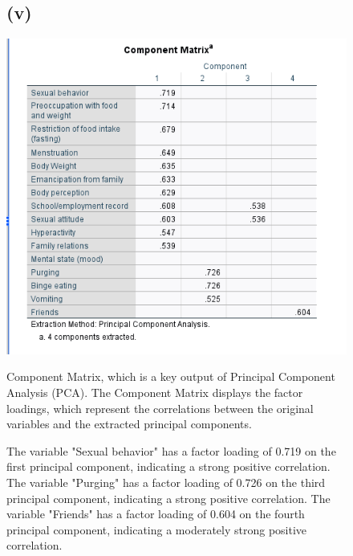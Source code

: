 \documentclass[english,10pt,a4paper]{article}
\begin{document}
\begin{figure}
		\subsection*{(v)}
	\includegraphics[width=1\linewidth]{component matrix.png}

Component Matrix, which is a key output of Principal Component Analysis (PCA). The Component Matrix displays the factor loadings, which represent the correlations between the original variables and the extracted principal components.

The variable "Sexual behavior" has a factor loading of 0.719 on the first principal component, indicating a strong positive correlation.
The variable "Purging" has a factor loading of 0.726 on the third principal component, indicating a strong positive correlation.
The variable "Friends" has a factor loading of 0.604 on the fourth principal component, indicating a moderately strong positive correlation.	
		
\end{figure}
\end{document}
